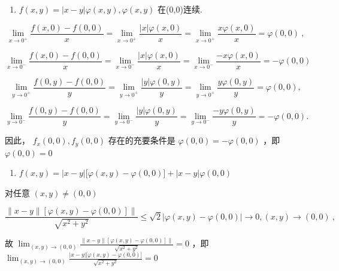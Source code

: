 \documentclass[11pt,fontset=fandol]{ctexart}
\providecommand{\tightlist}{\setlength{\itemsep}{0pt}\setlength{\parskip}{0pt}}
\begin{document}
\begin{enumerate}
\def\labelenumi{(\arabic{enumi})}
\tightlist
\item
  \(f ( x , y ) = \left| x - y \right| \varphi ( x , y ) , \varphi ( x , y )\)
  在(0,0)连续.
\end{enumerate}

\[
\lim _ { x \to 0 ^ { + } } { \frac { f ( x , 0 ) - f ( 0 , 0 ) } { x } } = \lim _ { x \to 0 ^ { + } } { \frac { \left| x \right| \varphi ( x , 0 ) } { x } } = \lim _ { x \to 0 ^ { + } } { \frac { x \varphi ( x , 0 ) } { x } } = \varphi ( 0 , 0 ) \ ,
\]

\[
\lim _ { x \to 0 ^ { - } } { \frac { f ( x , 0 ) - f ( 0 , 0 ) } { x } } = \lim _ { x \to 0 ^ { - } } { \frac { \left| x \right| \varphi ( x , 0 ) } { x } } = \lim _ { x \to 0 ^ { - } } { \frac { - x \varphi ( x , 0 ) } { x } } = - \varphi ( 0 , 0 )
\]

\[
\lim _ { y \to 0 ^ { + } } \frac { f ( 0 , y ) - f ( 0 , 0 ) } { y } = \lim _ { y \to 0 ^ { + } } \frac { \left| y \right| \varphi ( 0 , y ) } { y } = \lim _ { y \to 0 ^ { + } } \frac { y \varphi ( 0 , y ) } { y } = \varphi ( 0 , 0 ) ,
\]

\[
\lim _ { y \to 0 ^ { - } } \frac { f ( 0 , y ) - f ( 0 , 0 ) } { y } = \lim _ { y \to 0 ^ { - } } \frac { \left| y \right| \varphi ( 0 , y ) } { y } = \lim _ { y \to 0 ^ { - } } \frac { - y \varphi ( 0 , y ) } { y } = - \varphi ( 0 , 0 ) .
\]

因此， \(f _ { x } ( 0 , 0 ) , f _ { y } ( 0 , 0 )\) 存在的充要条件是
\(\varphi ( 0 , 0 ) = - \varphi ( 0 , 0 )\) ，即
\(\varphi ( 0 , 0 ) = 0\)

\begin{enumerate}
\def\labelenumi{(\arabic{enumi})}
\setcounter{enumi}{1}
\tightlist
\item
  \(f ( x , y ) = \left| x - y \right| { \bigl [ } \varphi ( x , y ) - \varphi ( 0 , 0 ) { \bigr ] } + \left| x - y \right| \varphi ( 0 , 0 )\)
\end{enumerate}

对任意 \(( x , y ) \neq ( 0 , 0 )\)

\[
\frac { \| x - y \| [ \varphi ( x , y ) - \varphi ( 0 , 0 ) ] \| } { \sqrt { x ^ { 2 } + y ^ { 2 } } } \le \sqrt { 2 }\left|\varphi ( x , y ) - \varphi ( 0 , 0 )\right| \to 0 , ( x , y ) \to ( 0 , 0 ) \ ,
\]

故
\(\lim _ { ( x , y ) \to ( 0 , 0 ) } { \frac { \| x - y \| [ \varphi ( x , y ) - \varphi ( 0 , 0 ) ] \| } { \sqrt { x ^ { 2 } + y ^ { 2 } } } } = 0\)
，即
\(\lim _ { ( x , y ) \to ( 0 , 0 ) } { \frac { { \Big | } x - y { \Big | } { \big [ } \varphi ( x , y ) - \varphi ( 0 , 0 ) { \big ] } } { \sqrt { x ^ { 2 } + y ^ { 2 } } } } = 0\)
\end{document}
